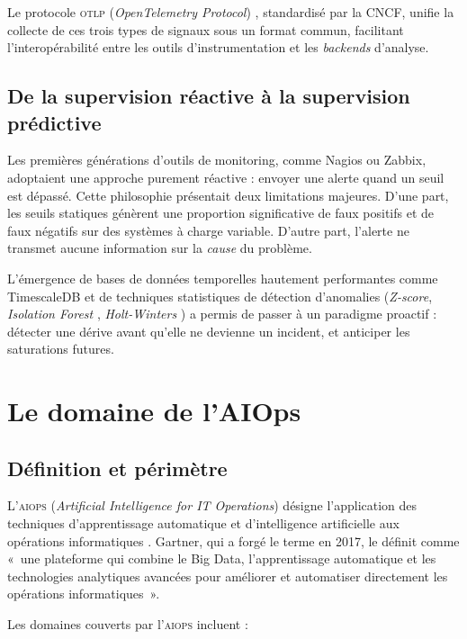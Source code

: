 Le protocole \textsc{otlp} (\textit{OpenTelemetry Protocol}) \cite{otlp_spec},
standardisé par la CNCF, unifie la collecte de ces trois types de signaux sous
un format commun, facilitant l'interopérabilité entre les outils d'instrumentation
et les \textit{backends} d'analyse.

\subsection{De la supervision réactive à la supervision prédictive}

Les premières générations d'outils de monitoring, comme Nagios ou Zabbix, adoptaient
une approche purement réactive : envoyer une alerte quand un seuil est dépassé.
Cette philosophie présentait deux limitations majeures. D'une part, les seuils
statiques génèrent une proportion significative de faux positifs et de faux négatifs
sur des systèmes à charge variable. D'autre part, l'alerte ne transmet aucune
information sur la \textit{cause} du problème.

L'émergence de bases de données temporelles hautement performantes comme
TimescaleDB \cite{timescaledb2017} et de techniques statistiques de détection
d'anomalies (\textit{Z-score}, \textit{Isolation Forest} \cite{liu2008isolation},
\textit{Holt-Winters} \cite{winters1960forecasting}) a permis de passer à un
paradigme proactif : détecter une dérive avant qu'elle ne devienne un incident,
et anticiper les saturations futures.

\section{Le domaine de l'AIOps}

\subsection{Définition et périmètre}

L'\textsc{aiops} (\textit{Artificial Intelligence for IT Operations}) désigne
l'application des techniques d'apprentissage automatique et d'intelligence
artificielle aux opérations informatiques \cite{gartner_aiops2021}. Gartner, qui
a forgé le terme en 2017, le définit comme «~une plateforme qui combine le Big
Data, l'apprentissage automatique et les technologies analytiques avancées pour
améliorer et automatiser directement les opérations informatiques~».

Les domaines couverts par l'\textsc{aiops} incluent :


